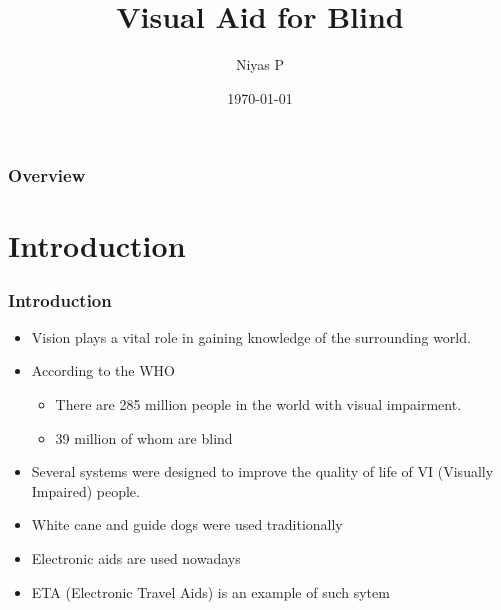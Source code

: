 \documentclass{beamer}
\title[Visual Aid for Blind]{Visual Aid for Blind} %
\author{Niyas P} %
\institute[College of Engineering, Trivandrum] %
{TVE17ECSP10\\M. Tech (Signal Procesing)\\Third Semester\\
\medskip
\textit{https://github.com/niyaspcet/MTechMainProject}\\ %
\vspace{1cm}
\textit{Guide}\\
Dr. Sreelatha G.\\
Assistant Professor\\
Department of ECE\\
College of Engineering, Trivandrum


}
\date{\today} %
\begin{document}
\begin{frame}[plain]

\titlepage %
\end{frame}

\begin{frame}
\frametitle{Overview} %
\tableofcontents %
\end{frame}


\section{Introduction} %


\begin{frame}
\frametitle{Introduction}
\begin{itemize}
\item
Vision plays a vital role in gaining knowledge of the surrounding
world.
\item
According to the WHO
\begin{itemize}
\item
There are 285 million people in the world with visual
impairment.
\item
39 million of whom are blind
\end{itemize}
\item
Several systems were designed to improve the quality of life of VI (Visually Impaired) people.
\item
White cane and guide dogs were used traditionally
\item
Electronic aids are used nowadays
\item
ETA (Electronic Travel Aids) is an example of such sytem
\end{itemize}
\end{frame}
\end{document}
